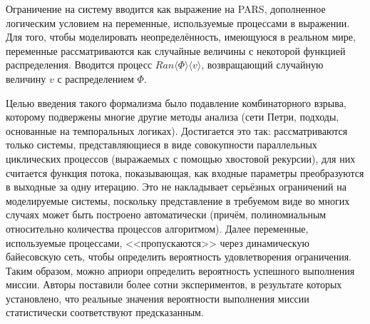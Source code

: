 \documentclass[a4, 14pt]{article}
\begin{document}
Ограничение на систему вводится как выражение на PARS, дополненное логическим 
условием на переменные, используемые процессами в выражении. Для того, чтобы 
моделировать неопределённость, имеющуюся в реальном мире, переменные 
рассматриваются как случайные величины с некоторой функцией распределения.
Вводится процесс $Ran\langle\Phi\rangle\langle v\rangle$, возвращающий случайную величину 
$v$ с распределением $\Phi$.

Целью введения такого формализма было подавление комбинаторного взрыва, которому 
подвержены многие другие методы анализа (сети Петри, подходы, основанные на 
темпоральных логиках). Достигается это так: рассматриваются только системы, 
представляющиеся в виде совокупности параллельных циклических процессов 
(выражаемых с помощью хвостовой рекурсии), для них считается функция потока, 
показывающая, как входные параметры преобразуются в выходные за одну итерацию. 
Это не накладывает серьёзных ограничений на моделируемые системы, поскольку 
представление в требуемом виде во многих случаях может быть построено 
автоматически (причём, полиномиальным относительно количества процессов 
алгоритмом). Далее переменные, используемые процессами, <<пропускаются>> 
через динамическую байесовскую сеть, чтобы определить вероятность удовлетворения 
ограничения. Таким образом, можно априори определить вероятность успешного 
выполнения миссии. Авторы поставили более сотни экспериментов, в результате 
которых установлено, что реальные значения вероятности выполнения миссии 
статистически соответствуют предсказанным.
\end{document}
